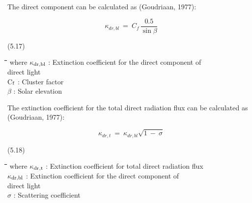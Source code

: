 \documentclass[11pt]{article}
\begin{document}
\bigskip
\bigskip
The direct component can be calculated as (Goudriaan, 1977):

\begin{displaymath}
\kappa _{dr,bl} ~=~{ C _{f} }\,{\frac{0.5}{\sin \beta }}
\end{displaymath}

 \bigskip
\strut\hfill (5.17)

\nwln
\begin{tabbing}
\hspace{1.27cm}\=\hspace{1.27cm}\=\hspace{1.27cm}\=\hspace{1.27cm}\=%
\hspace{1.27cm}\=\hspace{1.27cm}\=\hspace{1.27cm}\=\hspace{1.27cm}\=%
\hspace{1.27cm}\=\hspace{1.27cm}\=\kill
where\> $\kappa$$_{{\rm dr,bl}}$\> : Extinction coefficient for the direct component of \\
\>\>   direct light\> \> \> \> \> \> \> \> [-] \\
\>C$_{{\rm f}}$\> : Cluster factor\> \> \> \> \> \> \> \> [-]\\
\>$\beta$\> : Solar elevation\> \> \> \> \> \> \> \> [degrees]
\end{tabbing}

\bigskip
\bigskip
The extinction coefficient for the total direct radiation flux can be calculated as
{\nobreak}(Goudriaan, 1977):

\begin{displaymath}
\kappa _{dr,t} ~=~ \kappa _{dr,bl} \sqrt{1~-~\sigma }
\end{displaymath}

 \bigskip
\strut\hfill (5.18)
\nwln
\begin{tabbing}
\hspace{1.27cm}\=\hspace{1.27cm}\=\hspace{1.27cm}\=\hspace{1.27cm}\=%
\hspace{1.27cm}\=\hspace{1.27cm}\=\hspace{1.27cm}\=\hspace{1.27cm}\=%
\hspace{1.27cm}\=\hspace{1.27cm}\=\kill
where\> $\kappa$$_{{\rm dr,t}}$\> : Extinction coefficient for total direct radiation flux\> \> \> \> \> \> \> \> [-]\\
\>$\kappa$$_{{\rm dr,bl}}$\> : Extinction coefficient for the direct component of \\
\>\>   direct light\> \> \> \> \> \> \> \> [-]\\
 \>$\sigma$\> : Scattering coefficient \> \> \> \> \> \> \> \> [-]
\end{tabbing}
\end{document}
